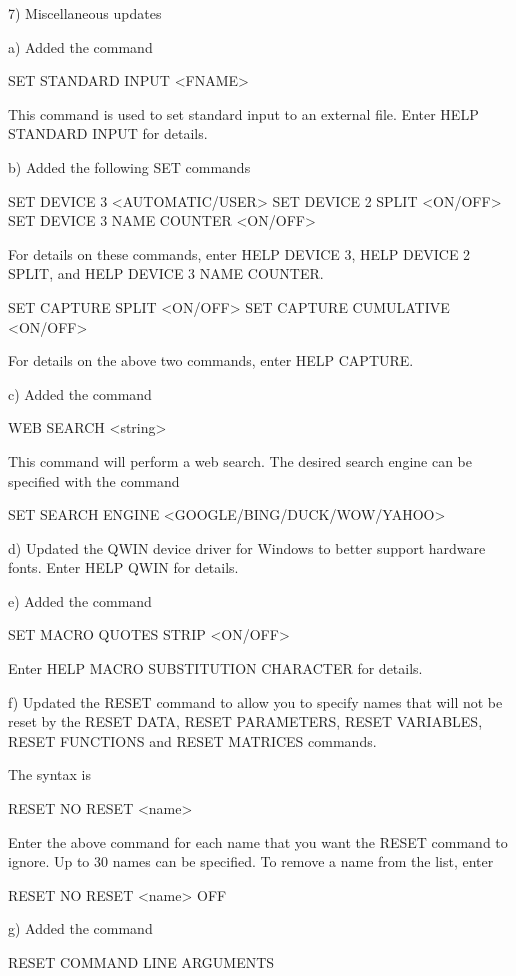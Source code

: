  7) Miscellaneous updates

    a) Added the command

          SET STANDARD INPUT <FNAME>

       This command is used to set standard input to an external
       file.  Enter HELP STANDARD INPUT for details.

    b) Added the following SET commands

          SET DEVICE 3 <AUTOMATIC/USER>
          SET DEVICE 2 SPLIT <ON/OFF>
          SET DEVICE 3 NAME COUNTER <ON/OFF>

       For details on these commands, enter HELP DEVICE 3,
       HELP DEVICE 2 SPLIT, and HELP DEVICE 3 NAME COUNTER.

          SET CAPTURE SPLIT <ON/OFF>
          SET CAPTURE CUMULATIVE <ON/OFF>

       For details on the above two commands, enter HELP CAPTURE.

    c) Added the command

          WEB SEARCH <string>

       This command will perform a web search.  The desired search
       engine can be specified with the command

          SET SEARCH ENGINE <GOOGLE/BING/DUCK/WOW/YAHOO>

   d) Updated the QWIN device driver for Windows to better support
      hardware fonts.  Enter HELP QWIN for details.

   e) Added the command

          SET MACRO QUOTES STRIP <ON/OFF>

      Enter HELP MACRO SUBSTITUTION CHARACTER for details.

   f) Updated the RESET command to allow you to specify names
      that will not be reset by the RESET DATA, RESET PARAMETERS,
      RESET VARIABLES, RESET FUNCTIONS and RESET MATRICES commands.

      The syntax is

         RESET NO RESET <name>

      Enter the above command for each name that you want the
      RESET command to ignore.  Up to 30 names can be specified.
      To remove a name from the list, enter

         RESET NO RESET <name> OFF

  g) Added the command

         RESET COMMAND LINE ARGUMENTS

